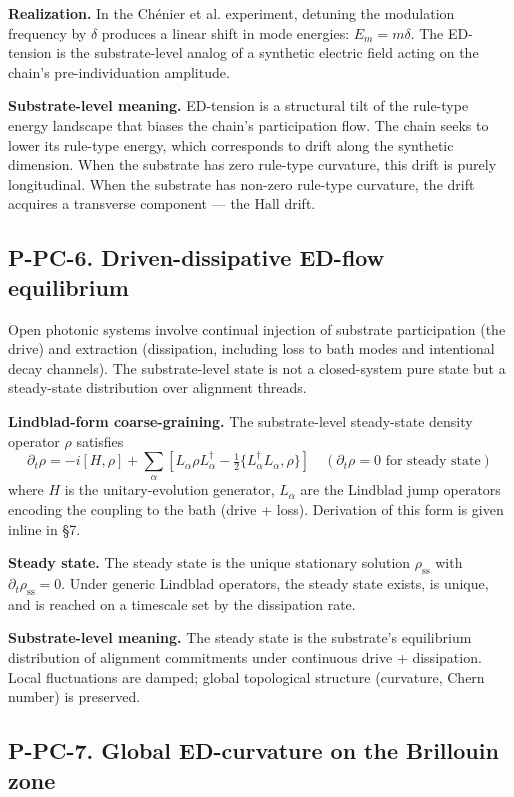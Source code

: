 \documentclass[11pt,a4paper]{article}
\begin{document}
\textbf{Realization.} In the Ch\'enier et al. experiment, detuning the modulation frequency by $\delta$ produces a linear shift in mode energies: $E_m = m\delta$. The ED-tension is the substrate-level analog of a synthetic electric field acting on the chain's pre-individuation amplitude.

\textbf{Substrate-level meaning.} ED-tension is a structural tilt of the rule-type energy landscape that biases the chain's participation flow. The chain seeks to lower its rule-type energy, which corresponds to drift along the synthetic dimension. When the substrate has zero rule-type curvature, this drift is purely longitudinal. When the substrate has non-zero rule-type curvature, the drift acquires a transverse component --- the Hall drift.

\subsection{P-PC-6. Driven-dissipative ED-flow equilibrium}

Open photonic systems involve continual injection of substrate participation (the drive) and extraction (dissipation, including loss to bath modes and intentional decay channels). The substrate-level state is not a closed-system pure state but a steady-state distribution over alignment threads.

\textbf{Lindblad-form coarse-graining.} The substrate-level steady-state density operator $\rho$ satisfies
\[
\partial_t\rho = -i[H, \rho] + \sum_\alpha\left[L_\alpha\rho L_\alpha^\dagger - \tfrac{1}{2}\{L_\alpha^\dagger L_\alpha, \rho\}\right] \quad (\partial_t\rho = 0 \text{ for steady state})
\]
where $H$ is the unitary-evolution generator, $L_\alpha$ are the Lindblad jump operators encoding the coupling to the bath (drive + loss). Derivation of this form is given inline in \S7.

\textbf{Steady state.} The steady state is the unique stationary solution $\rho_{\mathrm{ss}}$ with $\partial_t\rho_{\mathrm{ss}} = 0$. Under generic Lindblad operators, the steady state exists, is unique, and is reached on a timescale set by the dissipation rate.

\textbf{Substrate-level meaning.} The steady state is the substrate's equilibrium distribution of alignment commitments under continuous drive + dissipation. Local fluctuations are damped; global topological structure (curvature, Chern number) is preserved.

\subsection{P-PC-7. Global ED-curvature on the Brillouin zone}
\end{document}
